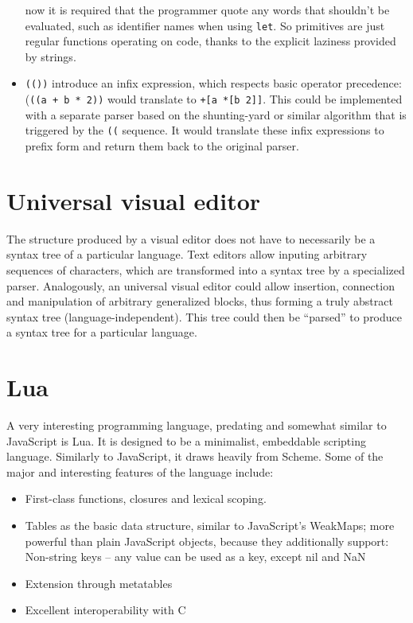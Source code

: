\begin{itemize}
      now it is required that the programmer quote any words that shouldn't be
      evaluated, such as identifier names when using \texttt{let}. So primitives
      are just regular functions operating on code, thanks to the explicit
      laziness provided by strings.
    \item \texttt{(())} introduce an infix expression, which respects basic
      operator precedence: (\texttt{((a + b * 2))} would translate to
      \texttt{+[a *[b 2]]}. This could be implemented with a separate parser
      based on the
      shunting-yard\cite{shunting_yard} or
      similar algorithm that is triggered by the \texttt{((} sequence. It would
      translate these infix expressions to prefix form and return them back to
      the original parser.
\end{itemize}

\section{Universal visual editor}
The structure produced by a visual editor does not have to necessarily be a
syntax tree of a particular language.  Text editors allow inputing arbitrary
sequences of characters, which are transformed into a syntax tree by a
specialized parser. Analogously, an universal visual editor could allow
insertion, connection and manipulation of arbitrary generalized blocks, thus
forming a truly abstract syntax tree (language-independent). This tree could
then be ``parsed'' to produce a syntax tree for a particular language.

\section{Lua}
A very interesting programming language, predating and somewhat similar to JavaScript is Lua. It is designed to be a minimalist, embeddable scripting language. Similarly to JavaScript, it draws heavily from Scheme. Some of the major and interesting features of the language include:
\begin{itemize}
    \item First-class functions, closures and lexical scoping.
    \item Tables as the basic data structure, similar to JavaScript's WeakMaps; more powerful than plain JavaScript objects, because they additionally support:
    Non-string keys -- any value can be used as a key, except nil and NaN
    \item Extension through metatables
    \item Excellent interoperability with C
\end{itemize} 


